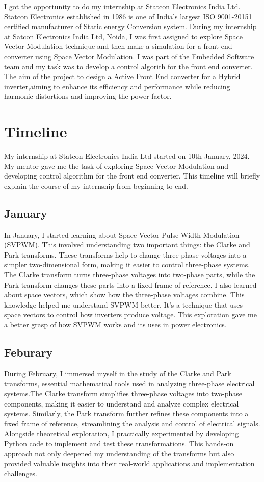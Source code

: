 I got the opportunity to do my internship at Statcon Electronics India Ltd.
Statcon Electronics established in 1986 is one of India's largest ISO
9001-20151 certified manufacturer of Static energy Conversion system. During my
internship at Satcon Electronics India Ltd, Noida, I was first assigned to
explore Space Vector Modulation technique and then make a simulation for a
front end converter using Space Vector Modulation. I was part of the Embedded
Software team and my task was to develop a control algorith for the front end
converter.\\

The aim of the project to design a Active Front End converter for a Hybrid
inverter,aiming to enhance its efficiency and performance while reducing
harmonic distortions and improving the power factor.

\section{Timeline}
My internship at Statcon Electronics India Ltd started on 10th January, 2024.
My mentor gave me the task of exploring Space Vector Modulation and developing
control algorithm for the front end converter. This timeline will briefly
explain the course of my internship from beginning to end.

\subsection{January}
In January, I started learning about Space Vector Pulse Width Modulation
(SVPWM). This involved understanding two important things: the Clarke and Park
transforms. These transforms help to change three-phase voltages into a simpler
two-dimensional form, making it easier to control three-phase systems. The
Clarke transform turns three-phase voltages into two-phase parts, while the
Park transform changes these parts into a fixed frame of reference. I also
learned about space vectors, which show how the three-phase voltages combine.
This knowledge helped me understand SVPWM better. It's a technique that uses
space vectors to control how inverters produce voltage. This exploration gave
me a better grasp of how SVPWM works and its uses in power electronics.

\subsection{Feburary}
During February, I immersed myself in the study of the Clarke and Park
transforms, essential mathematical tools used in analyzing three-phase
electrical systems.The Clarke transform simplifies three-phase voltages into
two-phase components, making it easier to understand and analyze complex
electrical systems. Similarly, the Park transform further refines these
components into a fixed frame of reference, streamlining the analysis and
control of electrical signals. Alongside theoretical exploration, I practically
experimented by developing Python code to implement and test these
transformations. This hands-on approach not only deepened my understanding of
the transforms but also provided valuable insights into their real-world
applications and implementation challenges.

